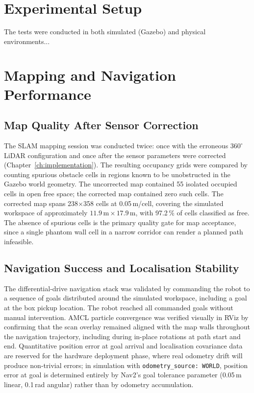 \label{ch:experiments}

\section{Experimental Setup}
The tests were conducted in both simulated (Gazebo) and physical environments...

\section{Mapping and Navigation Performance}

\subsection{Map Quality After Sensor Correction}
The SLAM mapping session was conducted twice: once with the erroneous $360^{\circ}$
LiDAR configuration and once after the sensor parameters were corrected
(Chapter~\ref{ch:implementation}). The resulting occupancy grids were compared
by counting spurious obstacle cells in regions known to be unobstructed in the
Gazebo world geometry. The uncorrected map contained 55 isolated occupied cells
in open free space; the corrected map contained zero such cells. The corrected
map spans 238$\times$358 cells at 0.05\,m/cell, covering the simulated workspace
of approximately $11.9\,\text{m}\times17.9\,\text{m}$, with 97.2\,\% of cells
classified as free. The absence of spurious cells is the primary quality gate for
map acceptance, since a single phantom wall cell in a narrow corridor can render
a planned path infeasible.

\subsection{Navigation Success and Localisation Stability}
The differential-drive navigation stack was validated by commanding the robot to
a sequence of goals distributed around the simulated workspace, including a goal
at the box pickup location. The robot reached all commanded goals without manual
intervention. AMCL particle convergence was verified visually in RViz by confirming
that the scan overlay remained aligned with the map walls throughout the navigation
trajectory, including during in-place rotations at path start and end. Quantitative
position error at goal arrival and localisation covariance data are reserved for
the hardware deployment phase, where real odometry drift will produce non-trivial
errors; in simulation with \texttt{odometry\_source: WORLD}, position error at goal
is determined entirely by Nav2's goal tolerance parameter (0.05\,m linear,
0.1\,rad angular) rather than by odometry accumulation.

